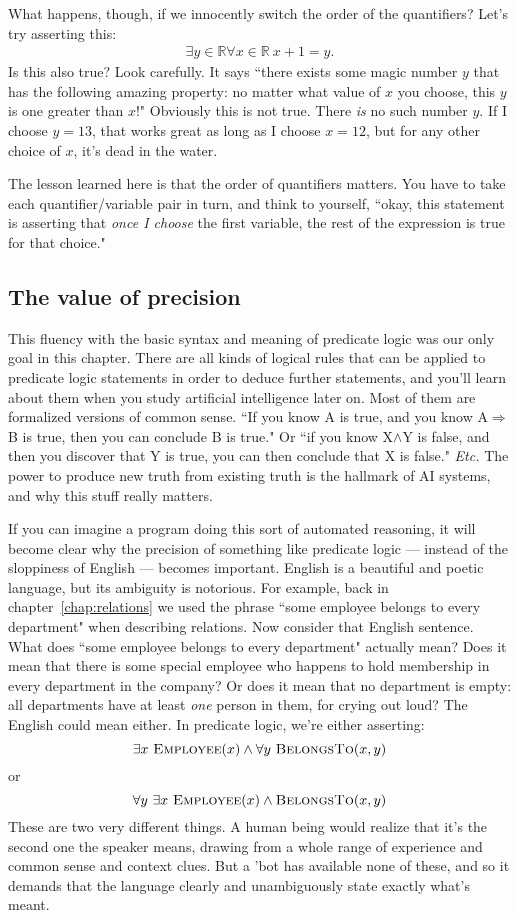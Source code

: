 What happens, though, if we innocently switch the order of the quantifiers?
Let's try asserting this:
\begin{align}
\exists y \in \mathbb{R} \forall x \in \mathbb{R} \ x+1=y.
\end{align}
Is this also true? Look carefully. It says ``there exists some magic number
$y$ that has the following amazing property: no matter what value of $x$
you choose, this $y$ is one greater than $x$!" Obviously this is not true.
There \textit{is} no such number $y$. If I choose $y=13$, that works great
as long as I choose $x=12$, but for any other choice of $x$, it's dead in
the water.

The lesson learned here is that the order of quantifiers matters. You have
to take each quantifier/variable pair in turn, and think to yourself,
``okay, this statement is asserting that \textit{once I choose} the first
variable, the rest of the expression is true for that choice."

\subsection{The value of precision}

This fluency with the basic syntax and meaning of predicate logic was our
only goal in this chapter. There are all kinds of logical rules that can be
applied to predicate logic statements in order to deduce further
statements, and you'll learn about them when you study artificial
intelligence later on. Most of them are formalized versions of common
sense. ``If you know A is true, and you know A$\Rightarrow$B is true, then
you can conclude B is true." Or ``if you know X$\wedge$Y is false, and then
you discover that Y is true, you can then conclude that X is false."
\textit{Etc.} The power to produce new truth from existing truth is the
hallmark of AI systems, and why this stuff really matters.

If you can imagine a program doing this sort of automated reasoning, it
will become clear why the precision of something like predicate logic ---
instead of the sloppiness of English --- becomes important. English is a
beautiful and poetic language, but its ambiguity is notorious. For example,
back in chapter~\ref{chap:relations} we used the phrase ``some employee
belongs to every department" when describing relations. Now consider that
English sentence. What does ``some employee belongs to every department"
actually mean? Does it mean that there is some special employee who happens
to hold membership in every department in the company? Or does it mean that
no department is empty: all departments have at least \textit{one} person
in them, for crying out loud? The English could mean either. In predicate
logic, we're either asserting:
\[
\exists x\ \textsc{Employee}(x) \wedge \forall y\ \textsc{BelongsTo}(x,y)
\]
or
\[
\forall y\ \exists x\ \textsc{Employee}(x) \wedge \textsc{BelongsTo}(x,y)
\]
These are two very different things. A human being would realize that it's
the second one the speaker means, drawing from a whole range of experience
and common sense and context clues. But a 'bot has available none of these,
and so it demands that the language clearly and unambiguously state exactly
what's meant.

